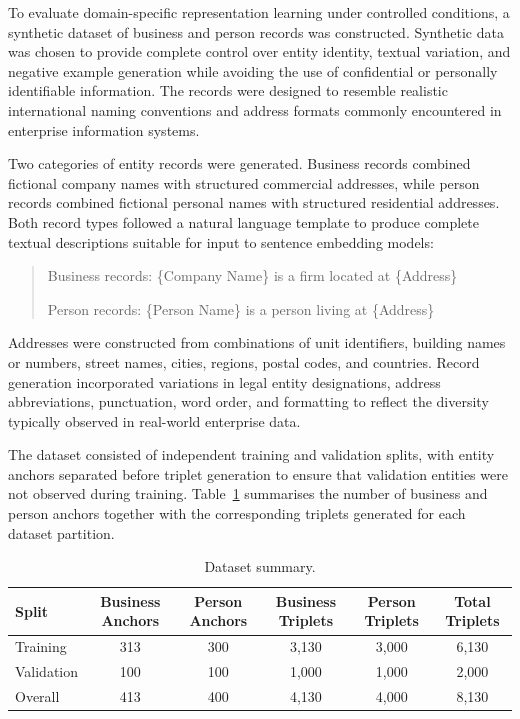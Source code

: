 \documentclass{article}
\begin{document}
To evaluate domain-specific representation learning under controlled conditions, a synthetic dataset of business and person records was constructed. Synthetic data was chosen to provide complete control over entity identity, textual variation, and negative example generation while avoiding the use of confidential or personally identifiable information. The records were designed to resemble realistic international naming conventions and address formats commonly encountered in enterprise information systems.

Two categories of entity records were generated. Business records combined fictional company names with structured commercial addresses, while person records combined fictional personal names with structured residential addresses. Both record types followed a natural language template to produce complete textual descriptions suitable for input to sentence embedding models:

\begin{quote}
Business records: \{Company Name\} is a firm located at \{Address\}

Person records: \{Person Name\} is a person living at \{Address\}
\end{quote}

Addresses were constructed from combinations of unit identifiers, building names or numbers, street names, cities, regions, postal codes, and countries. Record generation incorporated variations in legal entity designations, address abbreviations, punctuation, word order, and formatting to reflect the diversity typically observed in real-world enterprise data.

The dataset consisted of independent training and validation splits, with entity anchors separated before triplet generation to ensure that validation entities were not observed during training. Table~\ref{tab:dataset} summarises the number of business and person anchors together with the corresponding triplets generated for each dataset partition.

\begin{table}[t]
  \caption{Dataset summary.}
  \label{tab:dataset}
  \centering
  \begin{tabular}{lccccc}
    \toprule
    Split & Business Anchors & Person Anchors & Business Triplets & Person Triplets & Total Triplets \\
    \midrule
    Training   & 313 & 300 & 3{,}130 & 3{,}000 & 6{,}130 \\
    Validation & 100 & 100 & 1{,}000 & 1{,}000 & 2{,}000 \\
    Overall    & 413 & 400 & 4{,}130 & 4{,}000 & 8{,}130 \\
    \bottomrule
  \end{tabular}
\end{table}
\end{document}
